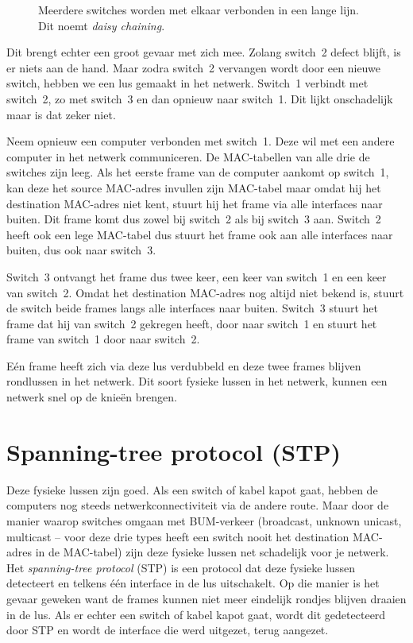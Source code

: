 \begin{figure}
    \centering
    
    \caption{Meerdere switches worden met elkaar verbonden in een lange lijn. Dit noemt \emph{daisy chaining}.}
    \label{fig:daisy-chain}
\end{figure}


Dit brengt echter een groot gevaar met zich mee.
Zolang switch~2 defect blijft, is er niets aan de hand.
Maar zodra switch~2 vervangen wordt door een nieuwe switch, hebben we een lus gemaakt in het netwerk.
Switch~1 verbindt met switch~2, zo met switch~3 en dan opnieuw naar switch~1.
Dit lijkt onschadelijk maar is dat zeker niet.

Neem opnieuw een computer verbonden met switch~1.
Deze wil met een andere computer in het netwerk communiceren.
De MAC-tabellen van alle drie de switches zijn leeg.
Als het eerste frame van de computer aankomt op switch~1, kan deze het source MAC-adres invullen zijn MAC-tabel maar omdat hij het destination MAC-adres niet kent, stuurt hij het frame via alle interfaces naar buiten.
Dit frame komt dus zowel bij switch~2 als bij switch~3 aan.
Switch~2 heeft ook een lege MAC-tabel dus stuurt het frame ook aan alle interfaces naar buiten, dus ook naar switch~3.

Switch~3 ontvangt het frame dus twee keer, een keer van switch~1 en een keer van switch~2.
Omdat het destination MAC-adres nog altijd niet bekend is, stuurt de switch beide frames langs alle interfaces naar buiten.
Switch~3 stuurt het frame dat hij van switch~2 gekregen heeft, door naar switch~1 en stuurt het frame van switch~1 door naar switch~2.

Eén frame heeft zich via deze lus verdubbeld en deze twee frames blijven rondlussen in het netwerk.
Dit soort fysieke lussen in het netwerk, kunnen een netwerk snel op de knieën brengen.



\section{Spanning-tree protocol (STP)}
Deze fysieke lussen zijn goed.
Als een switch of kabel kapot gaat, hebben de computers nog steeds netwerkconnectiviteit via de andere route.
Maar door de manier waarop switches omgaan met BUM-verkeer (broadcast, unknown unicast, multicast -- voor deze drie types heeft een switch nooit het destination MAC-adres in de MAC-tabel) zijn deze fysieke lussen net schadelijk voor je netwerk.
Het \emph{spanning-tree protocol} (STP) is een protocol dat deze fysieke lussen detecteert en telkens één interface in de lus uitschakelt.
Op die manier is het gevaar geweken want de frames kunnen niet meer eindelijk rondjes blijven draaien in de lus.
Als er echter een switch of kabel kapot gaat, wordt dit gedetecteerd door STP en wordt de interface die werd uitgezet, terug aangezet.

